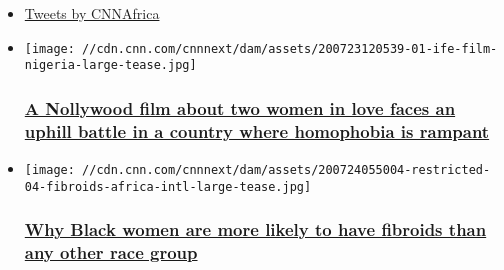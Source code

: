 \begin{itemize}
\item
  \href{https://twitter.com/CNNAfrica?ref_src=twsrc\%5Etfw}{Tweets by
  CNNAfrica}
\end{itemize}

\begin{itemize}
\item
  \href{/style/article/ife-queer-film-nigeria-intl/index.html}{}

  \texttt{[image: //cdn.cnn.com/cnnnext/dam/assets/200723120539-01-ife-film-nigeria-large-tease.jpg]}

  \hypertarget{a-nollywood-film-about-two-women-in-love-faces-an-uphill-battle-in-a-country-where-homophobia-is-rampant}{%
  \subsubsection{\texorpdfstring{\href{/style/article/ife-queer-film-nigeria-intl/index.html}{A
  Nollywood film about two women in love faces an uphill battle in a
  country where homophobia is
  rampant}}{A Nollywood film about two women in love faces an uphill battle in a country where homophobia is rampant}}\label{a-nollywood-film-about-two-women-in-love-faces-an-uphill-battle-in-a-country-where-homophobia-is-rampant}}
\end{itemize}

\begin{itemize}
\item
  \href{/2020/07/31/africa/fibroids-awareness-african-women-intl/index.html}{}

  \texttt{[image: //cdn.cnn.com/cnnnext/dam/assets/200724055004-restricted-04-fibroids-africa-intl-large-tease.jpg]}

  \hypertarget{why-black-women-are-more-likely-to-have-fibroids-than-any-other-race-group}{%
  \subsubsection{\texorpdfstring{\href{/2020/07/31/africa/fibroids-awareness-african-women-intl/index.html}{Why
  Black women are more likely to have fibroids than any other race
  group}}{Why Black women are more likely to have fibroids than any other race group}}\label{why-black-women-are-more-likely-to-have-fibroids-than-any-other-race-group}}
\end{itemize}

